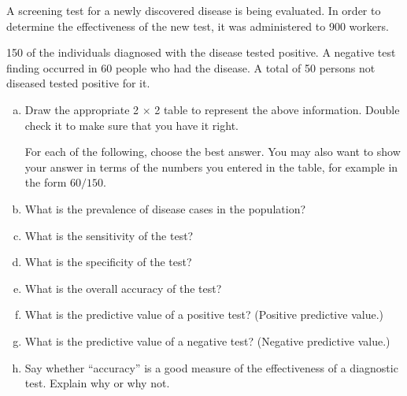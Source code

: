 A screening test for a newly discovered disease is being evaluated.  In order to determine the effectiveness of the new test, it was administered to 900 workers.

150 of the individuals diagnosed with the disease tested positive.  A negative test finding occurred in 60 people who had the disease.  A total of 50 persons not diseased tested positive for it.

\begin{enumerate}[(a)]

\item Draw the appropriate 2 $\times$ 2 table to represent the above information.  Double check it to make sure that you have it right.

\bigskip
\TextEntry

For each of the following, choose the best answer.  You may also want to show your answer in terms of the numbers you entered in the table, for example in the form  $60/150$.

\item What is the prevalence of disease cases in the population?
\begin{MultipleChoice}[itemname=III-45]
\end{MultipleChoice}

\item What is the sensitivity of the test?
\begin{MultipleChoice}[itemname=III-46]
\end{MultipleChoice}
\item What is the specificity of the test?
\begin{MultipleChoice}[itemname=III-47]
\end{MultipleChoice}
\item What is the overall accuracy of the test?
\begin{MultipleChoice}[itemname=III-48]
\end{MultipleChoice}
\item What is the predictive value of a positive test? (Positive predictive value.)
\begin{MultipleChoice}[itemname=III-49]
\end{MultipleChoice}
\item What is the predictive value of a negative test? (Negative predictive value.)
\begin{MultipleChoice}[itemname=III-50]
\end{MultipleChoice}
\item Say whether ``accuracy'' is a good measure of the effectiveness of a diagnostic test.  Explain why or why not.
\end{enumerate}

